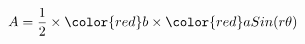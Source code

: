 \documentclass[preview]{standalone}
\begin{document}
\begin{align*}
A = \frac{1}{2} \times \color{red}b \times \color{red}a Sin(r\theta)
\end{align*}
\end{document}
